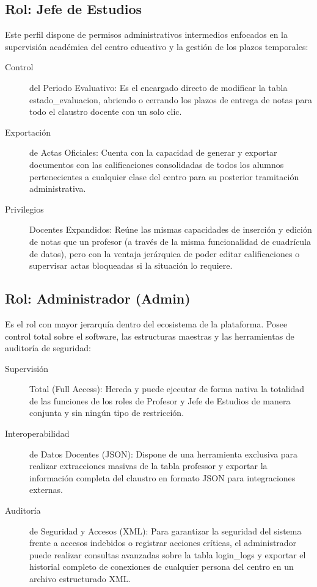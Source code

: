 \documentclass[spanish]{report}
\begin{document}
\subsection{Rol: Jefe de Estudios}

Este perfil dispone de permisos administrativos intermedios enfocados
en la supervisión académica del centro educativo y la gestión de los
plazos temporales:
\begin{description}
\item [{Control}] del Periodo Evaluativo: Es el encargado directo de modificar
la tabla estado\_evaluacion, abriendo o cerrando los plazos de entrega
de notas para todo el claustro docente con un solo clic.
\item [{Exportación}] de Actas Oficiales: Cuenta con la capacidad de generar
y exportar documentos con las calificaciones consolidadas de todos
los alumnos pertenecientes a cualquier clase del centro para su posterior
tramitación administrativa.
\item [{Privilegios}] Docentes Expandidos: Reúne las mismas capacidades
de inserción y edición de notas que un profesor (a través de la misma
funcionalidad de cuadrícula de datos), pero con la ventaja jerárquica
de poder editar calificaciones o supervisar actas bloqueadas si la
situación lo requiere.
\end{description}

\subsection{Rol: Administrador (Admin)}

Es el rol con mayor jerarquía dentro del ecosistema de la plataforma.
Posee control total sobre el software, las estructuras maestras y
las herramientas de auditoría de seguridad:
\begin{description}
\item [{Supervisión}] Total (Full Access): Hereda y puede ejecutar de forma
nativa la totalidad de las funciones de los roles de Profesor y Jefe
de Estudios de manera conjunta y sin ningún tipo de restricción.
\item [{Interoperabilidad}] de Datos Docentes (JSON): Dispone de una herramienta
exclusiva para realizar extracciones masivas de la tabla professor
y exportar la información completa del claustro en formato JSON para
integraciones externas.
\item [{Auditoría}] de Seguridad y Accesos (XML): Para garantizar la seguridad
del sistema frente a accesos indebidos o registrar acciones críticas,
el administrador puede realizar consultas avanzadas sobre la tabla
login\_logs y exportar el historial completo de conexiones de cualquier
persona del centro en un archivo estructurado XML.
\end{description}
\end{document}
